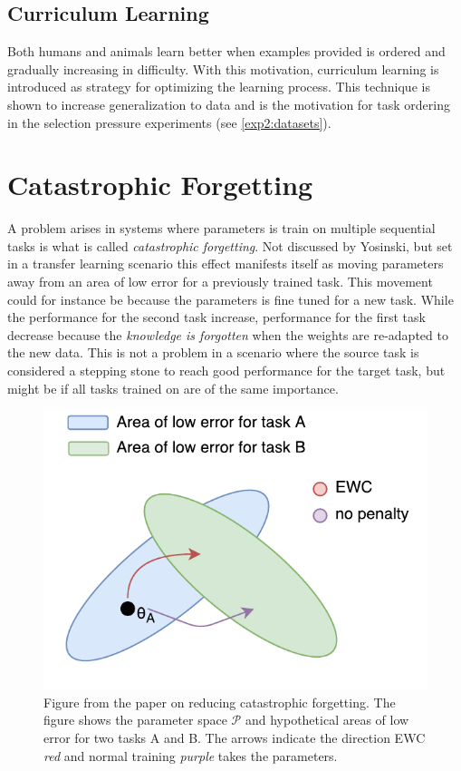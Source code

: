 \subsection{Curriculum Learning}
Both humans and animals learn better when examples provided is ordered and gradually increasing in difficulty. With this motivation, curriculum learning is introduced as strategy for optimizing the learning process. This technique is shown to increase generalization to data\cite{curriculumlearning} and is the motivation for task ordering in the selection pressure experiments (see \ref{exp2:datasets}).

\section{Catastrophic Forgetting}
A problem arises in systems where parameters is train on multiple sequential tasks is what is called \textit{catastrophic forgetting}. Not discussed by Yosinski, but set in a transfer learning scenario this effect manifests itself as moving parameters away from an area of low error for a previously trained task. This movement could for instance be because the parameters is fine tuned for a new task. While the performance for the second task increase, performance for the first task decrease because the \textit{knowledge is forgotten} when the weights are re-adapted to the new data. This is not a problem in a scenario where the source task is considered a stepping stone to reach good performance for the target task, but might be if all tasks trained on are of the same importance.

\begin{figure}[h]
    \centering
    \includegraphics[width=0.7\linewidth]{Chapters/Background/figures/EWC.pdf}
    \caption{Figure from the paper on reducing catastrophic forgetting\cite{ewc}. The figure shows the parameter space \(\mathcal{P}\) and hypothetical areas of low error for two tasks A and B. The arrows indicate the direction EWC \textit{red} and normal training \textit{purple} takes the parameters.}
    \label{fig:ewc}
\end{figure}

